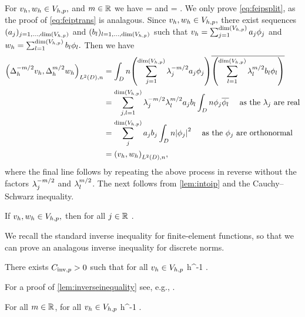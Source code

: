 \label{lem:intoip}
For $v_{h}, w_{h} \in V_{h,p},$ and $m \in \mathbb R$ we have
\beq\label{eq:feipsplit}
\IPLtDn{\vh}{\wh} = \IPLtDn{\Deltahmmt \vh}{\Deltahmt \wh} 
\eeq
and
\beq\label{eq:feiptrans}
 = \IPLtDn{\Deltahmt \vh}{\Deltahmt \vh}.
\eeq
\ele
{}
We only prove \cref{eq:feipsplit}, as the proof of \cref{eq:feiptrans} is analagous. Since $v_{h},w_{h} \in V_{h,p},$ there exist sequences $(\aj)_{j =1,\ldots,\dimVhp}$ and $(\bsl)_{l =1,\ldots,\dimVhp}$ such that $\vh = \sum_{j=1}^{\dimVhp} \aj\phij$ and $\wh = \sum_{l=1}^{\dimVhp} \bsl \phil.$ Then we have
\begin{align*}
\IPLtDn{\Deltahmmt \vh}{\Deltahmt \wh} &= \int_D n\mleft(\sum_{j=1}^{\dimVhp}\lambdaj^{-m/2} \aj\phij\mright)\overline{\mleft(\sum_{l=1}^{\dimVhp} \lambdal^{m/2}\bsl \phil\mright)}\\
&= \sum_{j,l=1}^{\dimVhp} \lambdaj^{-m/2} \lambdal^{m/2} \aj \bsl \int_D n \phij \philbar\quad \text{ as the } \lambdaj \text{ are real}\\
& =\sum_{j}^{\dimVhp} \aj \bsj \int_D n\abs{\phij}^2\quad \text{ as the } \phij \text{ are orthonormal}\\
&= \IPLtDn{\vh}{\wh},
\end{align*}
where the final line follows by repeating the above process in reverse without the factors $\lambda_{j}^{-m/2}$ and $\lambda_{l}^{m/2}$.
\epf
The next  follows from \cref{lem:intoip} and the Cauchy--Schwarz inequality.

\label{cor:ipdiscbound}
If $v_{h}, w_{h} \in V_{h,p},$ then for all $j \in \mathbb R$
\beqs
\IPLtDn{\vh}{\wh} \leq \Njh{\vh}\Nmjh{\wh}.
\eeqs
\eco

We recall the standard inverse inequality for finite-element functions, so that we can prove an analagous inverse inequality for discrete norms.

\label{lem:inverseinequality}
There exists $C_{\mathrm{inv},p} > 0$ such that for all $v_{h} \in V_{h,p}$
\beqs
\NHoD{\vh} \leq \CinvVhp h^{-1} \NLtD{\vh}.
\eeqs
\ele

For a proof of \cref{lem:inverseinequality} see, e.g., \cite[Theorem 4.5.11 and Remark 4.5.20]{BrSc:08}.

\label{lem:inversediscrete}
For all $m \in \mathbb R$, for all $v_{h} \in V_{h,p}$
\beqs
\Nmhn{\vh} \leq \Chinv {} h^{-1} \Nmmohn{\vh}.
\eeqs
\ele

